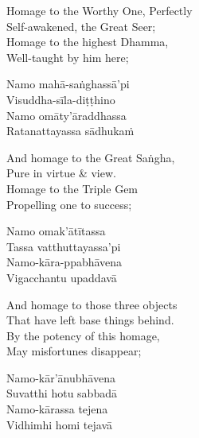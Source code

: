 \begin{english-verses}
  Homage to the Worthy One, Perfectly\\
  Self-awakened, the Great Seer;\\
  Homage to the highest Dhamma,\\
  Well-taught by him here;
\end{english-verses}

\begin{pali-hang-continued}
  Namo mahā-saṅghassā'pi\\
  Visuddha-sīla-diṭṭhino\\
  Namo omāty'āraddhassa\\
  Ratanattayassa sādhukaṁ
\end{pali-hang-continued}

\begin{english-verses}
  And homage to the Great Saṅgha,\\
  Pure in virtue \& view.\\
  Homage to the Triple Gem\\
  Propelling one to success;
\end{english-verses}

\ifninebythirteen\clearpage\fi

\begin{pali-hang-continued}
  Namo omak'ātītassa\\
  Tassa vatthuttayassa'pi\\
  Namo-kāra-ppabhāvena\\
  Vigacchantu upaddavā\\
\end{pali-hang-continued}

\ifbfive\clearpage\fi

\begin{english-verses}
  And homage to those three objects\\
  That have left base things behind.\\
  By the potency of this homage,\\
  \ifbfive\enlargethispage{1\baselineskip}\fi
  May misfortunes disappear;
\end{english-verses}

\begin{pali-hang-continued}
  Namo-kār'ānubhāvena\\
  Suvatthi hotu sabbadā\\
  Namo-kārassa tejena\\
  Vidhimhi homi tejavā
\end{pali-hang-continued}

